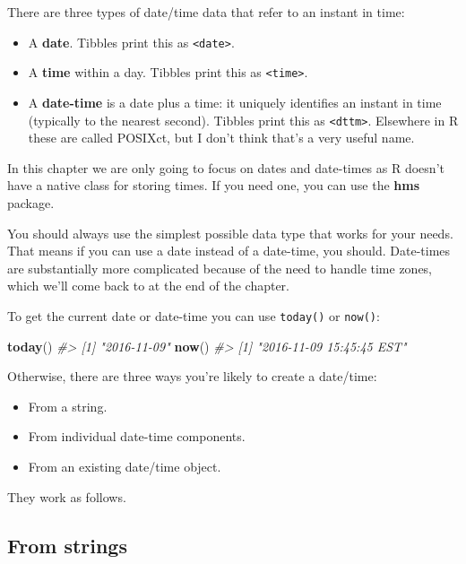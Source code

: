 \documentclass[]{book}
\newenvironment{Shaded}{\begin{snugshade}}{\end{snugshade}}
\newcommand{\KeywordTok}[1]{\textcolor[rgb]{0.13,0.29,0.53}{\textbf{{#1}}}}
\newcommand{\CommentTok}[1]{\textcolor[rgb]{0.56,0.35,0.01}{\textit{{#1}}}}
\newcommand{\NormalTok}[1]{{#1}}
\providecommand{\tightlist}{%
  \setlength{\itemsep}{0pt}\setlength{\parskip}{0pt}}
\begin{document}
There are three types of date/time data that refer to an instant in
time:

\begin{itemize}
\item
  A \textbf{date}. Tibbles print this as
  \texttt{\textless{}date\textgreater{}}.
\item
  A \textbf{time} within a day. Tibbles print this as
  \texttt{\textless{}time\textgreater{}}.
\item
  A \textbf{date-time} is a date plus a time: it uniquely identifies an
  instant in time (typically to the nearest second). Tibbles print this
  as \texttt{\textless{}dttm\textgreater{}}. Elsewhere in R these are
  called POSIXct, but I don't think that's a very useful name.
\end{itemize}

In this chapter we are only going to focus on dates and date-times as R
doesn't have a native class for storing times. If you need one, you can
use the \textbf{hms} package.

You should always use the simplest possible data type that works for
your needs. That means if you can use a date instead of a date-time, you
should. Date-times are substantially more complicated because of the
need to handle time zones, which we'll come back to at the end of the
chapter.

To get the current date or date-time you can use \texttt{today()} or
\texttt{now()}:

\begin{Shaded}
\begin{Highlighting}[]
\KeywordTok{today}\NormalTok{()}
\CommentTok{#> [1] "2016-11-09"}
\KeywordTok{now}\NormalTok{()}
\CommentTok{#> [1] "2016-11-09 15:45:45 EST"}
\end{Highlighting}
\end{Shaded}

Otherwise, there are three ways you're likely to create a date/time:

\begin{itemize}
\tightlist
\item
  From a string.
\item
  From individual date-time components.
\item
  From an existing date/time object.
\end{itemize}

They work as follows.

\subsection{From strings}\label{from-strings}
\end{document}
